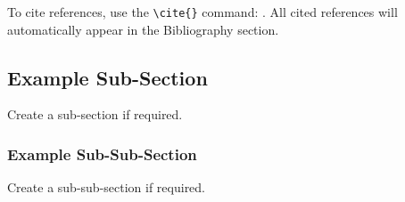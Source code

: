 To cite references, use the \verb!\cite{}! command: \cite{article_name}. All cited references will automatically appear in the Bibliography section.

\subsection{Example Sub-Section}\label{ssec:example_subsection}

Create a sub-section if required.

\subsubsection{Example Sub-Sub-Section}\label{sssec:example_subsubsection}

Create a sub-sub-section if required.